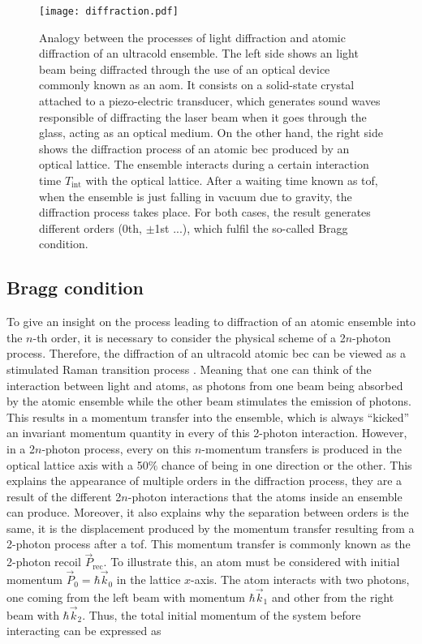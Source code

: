 \begin{figure}[!htbp]\centering
	\texttt{[image: diffraction.pdf]}
	\caption[Analogy between the processes of light diffraction and atomic diffraction of an ultracold ensemble]{Analogy between the processes of light diffraction and atomic diffraction of an ultracold ensemble. The left side shows an light beam being diffracted through the use of an optical device commonly known as an \Acf{aom}. It consists on a solid-state crystal attached to a piezo-electric transducer, which generates sound waves responsible of diffracting the laser beam when it goes through the glass, acting as an optical medium. On the other hand, the right side shows the diffraction process of an atomic \ac{bec} produced by an optical lattice. The ensemble interacts during a certain interaction time $T_{\text{int}}$ with the optical lattice. After a waiting time known as \Acf{tof}, when the ensemble is just falling in vacuum due to gravity, the diffraction process takes place. For both cases, the result generates different orders (0th, $\pm$1st ...), which fulfil the so-called Bragg condition.}\label{fig:diffraction}
\end{figure}

\pagebreak

\subsection{Bragg condition}

To give an insight on the process leading to diffraction of an atomic ensemble into the $n$-th order, it is necessary to consider the physical scheme of a 2$n$-photon process. Therefore, the diffraction of an ultracold atomic \ac{bec} can be viewed as a stimulated Raman transition process \cite{Kozuma1999}. Meaning that one can think of the interaction between light and atoms, as photons from one beam being absorbed by the atomic ensemble while the other beam stimulates the emission of photons. This results in a momentum transfer into the ensemble, which is always ``kicked'' an invariant momentum quantity in every of this 2-photon interaction. However, in a 2$n$-photon process, every on this $n$-momentum transfers is produced in the optical lattice axis with a 50$\%$ chance of being in one direction or the other. This explains the appearance of multiple orders in the diffraction process, they are a result of the different 2$n$-photon interactions that the atoms inside an ensemble can produce. Moreover, it also explains why the separation between orders is the same, it is the displacement produced by the momentum transfer resulting from a 2-photon process after a \ac{tof}. This momentum transfer is commonly known as the 2-photon recoil $\vec{P}_\text{rec}$. To illustrate this, an atom must be considered with initial momentum $\vec{P}_0 = \hbar \vec{k}_0$ in the lattice $x$-axis. The atom interacts with two photons, one coming from the left beam with momentum $\hbar \vec{k}_1$ and other from the right beam with $\hbar \vec{k}_2$. Thus, the total initial momentum of the system before interacting can be expressed as

